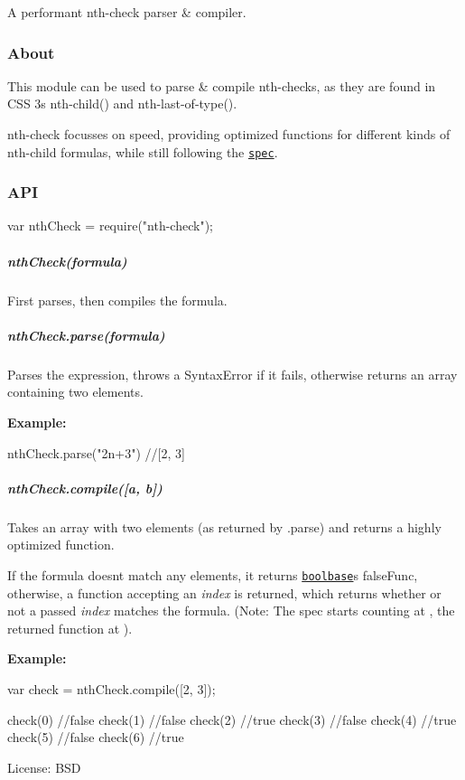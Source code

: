 A performant nth-\/check parser \& compiler.

\subsubsection*{About}

This module can be used to parse \& compile nth-\/checks, as they are found in C\+SS 3\textquotesingle{}s {\ttfamily nth-\/child()} and {\ttfamily nth-\/last-\/of-\/type()}.

{\ttfamily nth-\/check} focusses on speed, providing optimized functions for different kinds of nth-\/child formulas, while still following the \href{http://www.w3.org/TR/css3-selectors/#nth-child-pseudo}{\tt spec}.

\subsubsection*{A\+PI}


\begin{DoxyCode}
var nthCheck = require("nth-check");
\end{DoxyCode}


\subparagraph*{{\ttfamily nth\+Check(formula)}}

First parses, then compiles the formula.

\subparagraph*{{\ttfamily nth\+Check.\+parse(formula)}}

Parses the expression, throws a {\ttfamily Syntax\+Error} if it fails, otherwise returns an array containing two elements.

{\bfseries Example\+:}


\begin{DoxyCode}
nthCheck.parse("2n+3") //[2, 3]
\end{DoxyCode}


\subparagraph*{{\ttfamily nth\+Check.\+compile(\mbox{[}a, b\mbox{]})}}

Takes an array with two elements (as returned by {\ttfamily .parse}) and returns a highly optimized function.

If the formula doesn\textquotesingle{}t match any elements, it returns \href{https://github.com/fb55/boolbase}{\tt {\ttfamily boolbase}}\textquotesingle{}s {\ttfamily false\+Func}, otherwise, a function accepting an {\itshape index} is returned, which returns whether or not a passed {\itshape index} matches the formula. (Note\+: The spec starts counting at {}, the returned function at {}).

{\bfseries Example\+:} 
\begin{DoxyCode}
var check = nthCheck.compile([2, 3]);

check(0) //false
check(1) //false
check(2) //true
check(3) //false
check(4) //true
check(5) //false
check(6) //true
\end{DoxyCode}
 

 License\+: B\+SD 